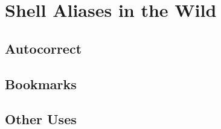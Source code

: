 \section{Shell Aliases in the Wild}






\subsection{Autocorrect}





\subsection{Bookmarks}

\subsection{Other Uses}



